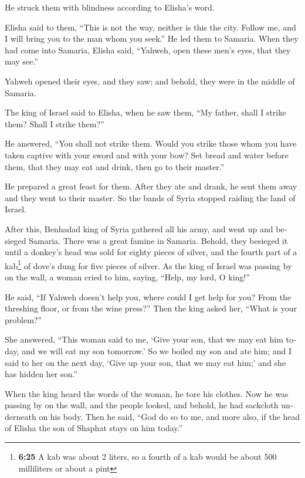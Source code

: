 \begin{paracol}{2}
\begin{otherlanguage}{english}
He struck them with blindness according to Elisha's word.

 Elisha said to them, ``This is not the way, neither is
this the city. Follow me, and I will bring you to the man whom you
seek.'' He led them to Samaria.  When they had come into
Samaria, Elisha said, ``Yahweh, open these men's eyes, that they may
see.''

Yahweh opened their eyes, and they saw; and behold, they were in the
middle of Samaria.

 The king of Israel said to Elisha, when he saw them,
``My father, shall I strike them? Shall I strike them?''

 He answered, ``You shall not strike them. Would you
strike those whom you have taken captive with your sword and with your
bow? Set bread and water before them, that they may eat and drink, then
go to their master.''

 He prepared a great feast for them. After they ate and
drank, he sent them away and they went to their master. So the bands of
Syria stopped raiding the land of Israel.

 After this, Benhadad king of Syria gathered all his
army, and went up and besieged Samaria.  There was a
great famine in Samaria. Behold, they besieged it until a donkey's head
was sold for eighty pieces of silver, and the fourth part of a
kab\footnote{\textbf{6:25} A kab was about 2 liters, so a fourth of a
  kab would be about 500 milliliters or about a pint} of dove's dung for
five pieces of silver.  As the king of Israel was passing
by on the wall, a woman cried to him, saying, ``Help, my lord, O king!''

 He said, ``If Yahweh doesn't help you, where could I get
help for you? From the threshing floor, or from the wine press?''
 Then the king asked her, ``What is your problem?''

She answered, ``This woman said to me, `Give your son, that we may eat
him today, and we will eat my son tomorrow.'  So we
boiled my son and ate him; and I said to her on the next day, `Give up
your son, that we may eat him;' and she has hidden her son.''

 When the king heard the words of the woman, he tore his
clothes. Now he was passing by on the wall, and the people looked, and
behold, he had sackcloth underneath on his body.  Then he
said, ``God do so to me, and more also, if the head of Elisha the son of
Shaphat stays on him today.''


\end{otherlanguage}
\end{paracol}
